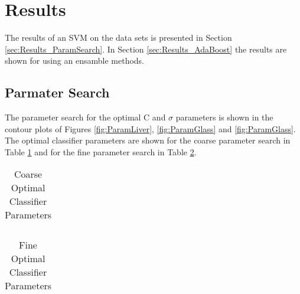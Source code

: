 \section{Results}
\label{sec:Results}

The results of an SVM on the data sets is presented in Section \ref{sec:Results_ParamSearch}.
In Section \ref{sec:Results_AdaBoost} the results are shown for using an ensamble methods.

\subsection{Parmater Search}
\label{ref:Results_ParamSearch}

The parameter search for the optimal C and $\sigma$ parameters is shown in the contour plots of Figures \ref{fig:ParamLiver}, \ref{fig:ParamGlass} and \ref{fig:ParamGlass}.
The optimal classifier parameters are shown for the coarse parameter search in Table \ref{tab:CoarseParamValues} and for the fine parameter search in Table \ref{tab:FineParamValues}.
\begin{table}[h!]
\caption{Coarse Optimal Classifier Parameters}
\label{tab:CoarseParamValues}
\centering
\begin{tabular}{c c c c c c c c}
\hline

\hline
\end{tabular}
\end{table}
\begin{table}[ht]
\caption{Fine Optimal Classifier Parameters}
\label{tab:FineParamValues}
\centering
\begin{tabular}{c c c c c c c c}
\hline

\hline
\end{tabular}
\end{table}

